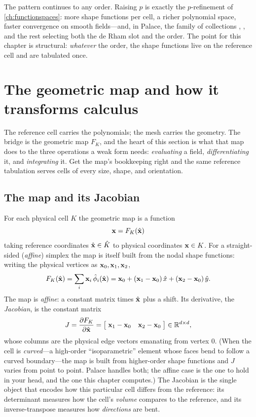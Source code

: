 The pattern continues to any order. Raising $p$ is exactly the $p$-refinement of
\cref{ch:functionspaces}: more shape functions per cell, a richer polynomial space,
faster convergence on smooth fields---and, in Palace, the family of collections
, , and the rest selecting both the de
Rham slot and the order. The point for this chapter is structural: \emph{whatever}
the order, the shape functions live on the reference cell and are tabulated once.

\section{The geometric map and how it transforms calculus}
\label{sec:map}

The reference cell carries the polynomials; the mesh carries the geometry. The bridge
is the geometric map $F_K$, and the heart of this section is what that map does to
the three operations a weak form needs: \emph{evaluating} a field, \emph{differentiating}
it, and \emph{integrating} it. Get the map's bookkeeping right and the same reference
tabulation serves cells of every size, shape, and orientation.

\subsection{The map and its Jacobian}

For each physical cell $K$ the geometric map is a function
\[
  \mathbf{x} = F_K(\hat{\mathbf{x}})
\]
taking reference coordinates $\hat{\mathbf{x}}\in\hat K$ to physical coordinates $\mathbf{x}\in K$.
For a straight-sided (\emph{affine}) simplex the map is itself built from the nodal
shape functions: writing the physical vertices as $\mathbf{x}_0,\mathbf{x}_1,\mathbf{x}_2$,
\[
  F_K(\hat{\mathbf{x}}) = \sum_i \mathbf{x}_i\,\hat\phi_i(\hat{\mathbf{x}})
  = \mathbf{x}_0 + (\mathbf{x}_1-\mathbf{x}_0)\,\hat x + (\mathbf{x}_2-\mathbf{x}_0)\,\hat y .
\]
The map is \emph{affine}: a constant matrix times $\hat{\mathbf{x}}$ plus a shift. Its
derivative, the \emph{Jacobian}, is the constant matrix
\[
  J = \frac{\partial F_K}{\partial\hat{\mathbf{x}}}
    = \bigl[\;\mathbf{x}_1-\mathbf{x}_0 \quad \mathbf{x}_2-\mathbf{x}_0\;\bigr]
    \in\mathbb{R}^{d\times d},
\]
whose columns are the physical edge vectors emanating from vertex $0$. (When the cell
is \emph{curved}---a high-order ``isoparametric'' element whose faces bend to follow
a curved boundary---the map is built from higher-order shape functions and $J$ varies
from point to point. Palace handles both; the affine case is the one to hold in your
head, and the one this chapter computes.) The Jacobian is the single object that
encodes how this particular cell differs from the reference: its determinant measures
how the cell's \emph{volume} compares to the reference, and its inverse-transpose
measures how \emph{directions} are bent.

